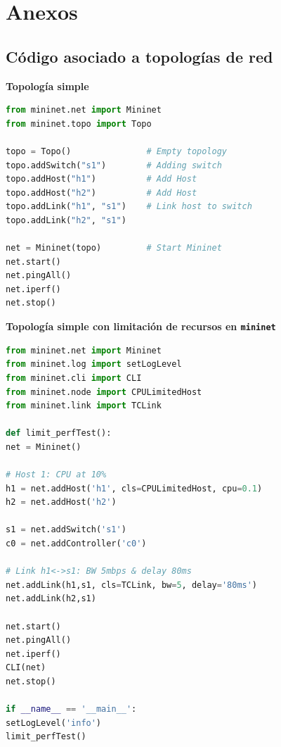 \documentclass[12pt]{article}
\begin{document}
	\pagebreak
	
	\appendix
	
	\section{Anexos}
	
	
	
	\subsection{Código asociado a topologías de red}
	\label{sec: anexo 4}
	
	\vspace{10px}
	\noindent \textbf{\large Topología simple}\\
	
	\begin{lstlisting}[language=Python, caption={Implementación topología simple utilizando \texttt{mininet} (\texttt{basic.py})}, label={lst: topo simple}]
from mininet.net import Mininet
from mininet.topo import Topo

topo = Topo()				# Empty topology
topo.addSwitch("s1")		# Adding switch
topo.addHost("h1")			# Add Host
topo.addHost("h2")			# Add Host
topo.addLink("h1", "s1")	# Link host to switch
topo.addLink("h2", "s1")

net = Mininet(topo)			# Start Mininet
net.start()
net.pingAll()
net.iperf()
net.stop()
	\end{lstlisting}

	\vspace{20px}
	\noindent \textbf{\large Topología simple con limitación de recursos en \texttt{mininet}}\\
	\begin{lstlisting}[language=Python, caption={Código topología simple con limitación de recursos en \texttt{mininet} (\texttt{limit.py})}, label={lst: topo simple cpu mn}]
from mininet.net import Mininet
from mininet.log import setLogLevel
from mininet.cli import CLI
from mininet.node import CPULimitedHost
from mininet.link import TCLink

def limit_perfTest():
net = Mininet()

# Host 1: CPU at 10%
h1 = net.addHost('h1', cls=CPULimitedHost, cpu=0.1)		
h2 = net.addHost('h2')

s1 = net.addSwitch('s1')
c0 = net.addController('c0')

# Link h1<->s1: BW 5mbps & delay 80ms
net.addLink(h1,s1, cls=TCLink, bw=5, delay='80ms')
net.addLink(h2,s1)

net.start()
net.pingAll()
net.iperf()
CLI(net)
net.stop()

if __name__ == '__main__':
setLogLevel('info')
limit_perfTest()
	\end{lstlisting}
\end{document}
